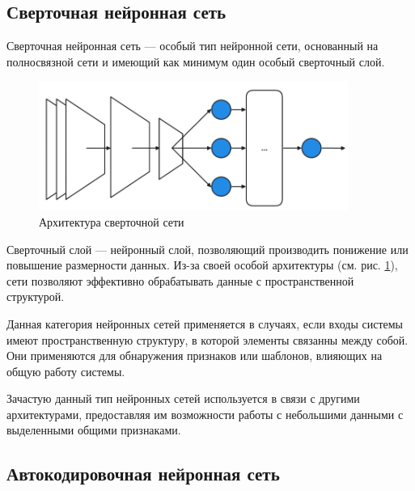 \subsection{Сверточная нейронная сеть}

Сверточная нейронная сеть — особый тип нейронной сети, основанный на
полносвязной сети и имеющий как минимум один особый сверточный слой. 

\begin{figure}[H]
  \centering
    \includegraphics[width=0.9\textwidth]{figures/arch_cnn.png}
  \caption{Архитектура сверточной сети}\label{fig:cnn}
\end{figure}

Сверточный слой — нейронный слой, позволяющий производить понижение или повышение
размерности данных. Из-за своей особой архитектуры (см. рис. \ref{fig:cnn}),
сети позволяют эффективно обрабатывать данные с пространственной структурой.

Данная категория нейронных сетей применяется в случаях, если входы системы
имеют пространственную структуру, в которой элементы связанны между собой. Они
применяются для обнаружения признаков или шаблонов, влияющих на общую работу
системы.

Зачастую данный тип нейронных сетей используется в связи с другими
архитектурами, предоставляя им возможности работы с небольшими данными с
выделенными общими признаками.

\subsection{Автокодировочная нейронная сеть}

